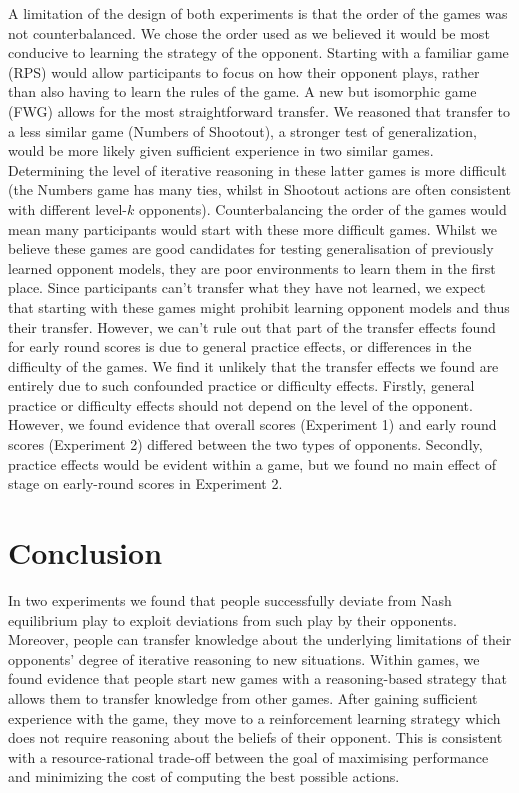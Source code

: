 \documentclass[smallextended]{svjour3}       %
\begin{document}
A limitation of the design of both experiments is that the order of the
games was not counterbalanced. We chose the order used as we believed it
would be most conducive to learning the strategy of the opponent.
Starting with a familiar game (RPS) would allow participants to focus on
how their opponent plays, rather than also having to learn the rules of
the game. A new but isomorphic game (FWG) allows for the most
straightforward transfer. We reasoned that transfer to a less similar
game (Numbers of Shootout), a stronger test of generalization, would be
more likely given sufficient experience in two similar games.
Determining the level of iterative reasoning in these latter games is
more difficult (the Numbers game has many ties, whilst in Shootout
actions are often consistent with different level-\(k\) opponents).
Counterbalancing the order of the games would mean many participants
would start with these more difficult games. Whilst we believe these
games are good candidates for testing generalisation of previously
learned opponent models, they are poor environments to learn them in the
first place. Since participants can't transfer what they have not
learned, we expect that starting with these games might prohibit
learning opponent models and thus their transfer. However, we can't rule
out that part of the transfer effects found for early round scores is
due to general practice effects, or differences in the difficulty of the
games. We find it unlikely that the transfer effects we found are
entirely due to such confounded practice or difficulty effects. Firstly,
general practice or difficulty effects should not depend on the level of
the opponent. However, we found evidence that overall scores (Experiment
1) and early round scores (Experiment 2) differed between the two types
of opponents. Secondly, practice effects would be evident within a game,
but we found no main effect of stage on early-round scores in Experiment
2.

\hypertarget{conclusion}{%
\section{Conclusion}\label{conclusion}}

In two experiments we found that people successfully deviate from Nash
equilibrium play to exploit deviations from such play by their
opponents. Moreover, people can transfer knowledge about the underlying
limitations of their opponents' degree of iterative reasoning to new
situations. Within games, we found evidence that people start new games
with a reasoning-based strategy that allows them to transfer knowledge
from other games. After gaining sufficient experience with the game,
they move to a reinforcement learning strategy which does not require
reasoning about the beliefs of their opponent. This is consistent with a
resource-rational trade-off between the goal of maximising performance
and minimizing the cost of computing the best possible actions.
\end{document}
